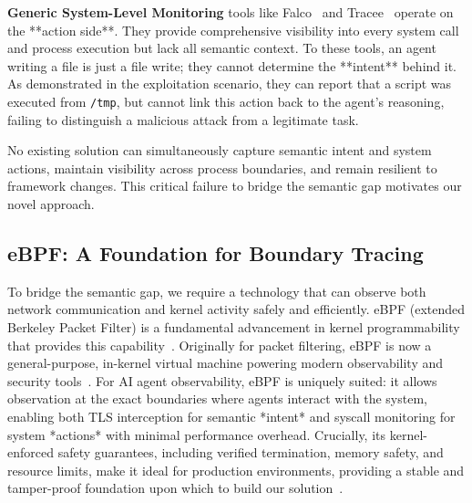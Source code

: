 \textbf{Generic System-Level Monitoring} tools like Falco~\cite{falco} and Tracee~\cite{tracee} operate on the **action side**. They provide comprehensive visibility into every system call and process execution but lack all semantic context. To these tools, an agent writing a file is just a file write; they cannot determine the **intent** behind it. As demonstrated in the exploitation scenario, they can report that a script was executed from \texttt{/tmp}, but cannot link this action back to the agent's reasoning, failing to distinguish a malicious attack from a legitimate task.

No existing solution can simultaneously capture semantic intent and system actions, maintain visibility across process boundaries, and remain resilient to framework changes. This critical failure to bridge the semantic gap motivates our novel approach.

\subsection{eBPF: A Foundation for Boundary Tracing}
To bridge the semantic gap, we require a technology that can observe both network communication and kernel activity safely and efficiently. eBPF (extended Berkeley Packet Filter) is a fundamental advancement in kernel programmability that provides this capability~\cite{brendangregg}. Originally for packet filtering, eBPF is now a general-purpose, in-kernel virtual machine powering modern observability and security tools~\cite{ebpfio,cilium}. For AI agent observability, eBPF is uniquely suited: it allows observation at the exact boundaries where agents interact with the system, enabling both TLS interception for semantic *intent* and syscall monitoring for system *actions* with minimal performance overhead. Crucially, its kernel-enforced safety guarantees, including verified termination, memory safety, and resource limits, make it ideal for production environments, providing a stable and tamper-proof foundation upon which to build our solution~\cite{kerneldoc}.